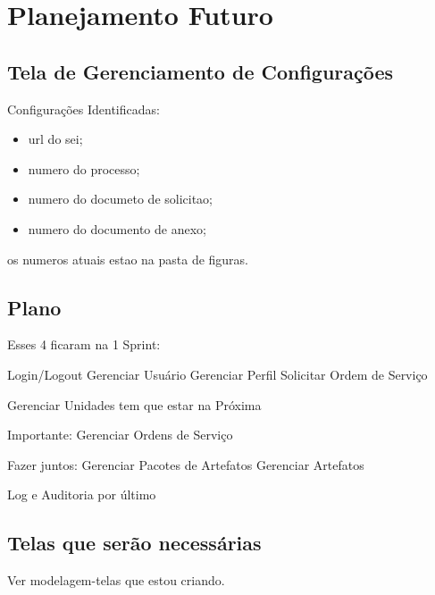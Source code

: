 \chapter{Planejamento Futuro}

\section{Tela de Gerenciamento de Configurações}

Configurações Identificadas:

\begin{itemize}
	\item url do sei;

	\item numero do processo;

	\item numero do documeto de solicitao;

	\item numero do documento de anexo;
\end{itemize}

os numeros atuais estao na pasta de figuras.



\section{Plano}

Esses 4 ficaram na 1 Sprint:

Login/Logout
Gerenciar Usuário
Gerenciar Perfil
Solicitar Ordem de Serviço

Gerenciar Unidades tem que estar na Próxima


Importante:
Gerenciar Ordens de Serviço


Fazer juntos:
Gerenciar Pacotes de Artefatos
Gerenciar Artefatos


Log e Auditoria por último



\section{Telas que serão necessárias}

Ver modelagem-telas que estou criando. 


